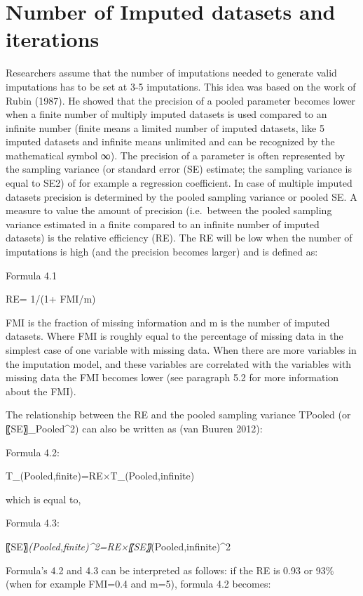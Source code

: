 \documentclass[]{book}
\theoremstyle{definition}
\theoremstyle{definition}
\theoremstyle{definition}
\theoremstyle{remark}
\begin{document}
\section{Number of Imputed datasets and
iterations}\label{number-of-imputed-datasets-and-iterations}

Researchers assume that the number of imputations needed to generate
valid imputations has to be set at 3-5 imputations. This idea was based
on the work of Rubin (1987). He showed that the precision of a pooled
parameter becomes lower when a finite number of multiply imputed
datasets is used compared to an infinite number (finite means a limited
number of imputed datasets, like 5 imputed datasets and infinite means
unlimited and can be recognized by the mathematical symbol ∞). The
precision of a parameter is often represented by the sampling variance
(or standard error (SE) estimate; the sampling variance is equal to SE2)
of for example a regression coefficient. In case of multiple imputed
datasets precision is determined by the pooled sampling variance or
pooled SE. A measure to value the amount of precision (i.e.~between the
pooled sampling variance estimated in a finite compared to an infinite
number of imputed datasets) is the relative efficiency (RE). The RE will
be low when the number of imputations is high (and the precision becomes
larger) and is defined as:

Formula 4.1

RE= 1/(1+ FMI/m)

FMI is the fraction of missing information and m is the number of
imputed datasets. Where FMI is roughly equal to the percentage of
missing data in the simplest case of one variable with missing data.
When there are more variables in the imputation model, and these
variables are correlated with the variables with missing data the FMI
becomes lower (see paragraph 5.2 for more information about the FMI).

The relationship between the RE and the pooled sampling variance TPooled
(or 〖SE〗\_Pooled\^{}2) can also be written as (van Buuren 2012):

Formula 4.2:

T\_(Pooled,finite)=RE×T\_(Pooled,infinite)

which is equal to,

Formula 4.3:

〖SE〗\emph{(Pooled,finite)\^{}2=RE×〖SE〗}(Pooled,infinite)\^{}2

Formula's 4.2 and 4.3 can be interpreted as follows: if the RE is 0.93
or 93\% (when for example FMI=0.4 and m=5), formula 4.2 becomes:
\end{document}
